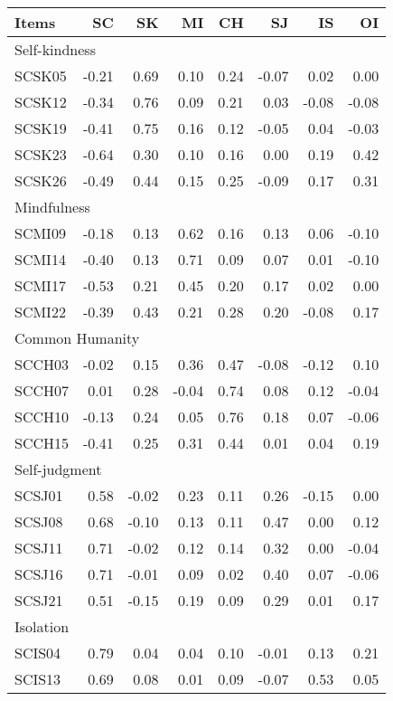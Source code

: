 \begin{longtable}{lrrrrrrr}
\toprule
Items & SC & SK & MI & CH & SJ & IS & OI \\ 
\midrule
\multicolumn{8}{l}{Self-kindness} \\ 
\midrule
SCSK05 & -0.21 & 0.69 & 0.10 & 0.24 & -0.07 & 0.02 & 0.00 \\ 
SCSK12 & -0.34 & 0.76 & 0.09 & 0.21 & 0.03 & -0.08 & -0.08 \\ 
SCSK19 & -0.41 & 0.75 & 0.16 & 0.12 & -0.05 & 0.04 & -0.03 \\ 
SCSK23 & -0.64 & 0.30 & 0.10 & 0.16 & 0.00 & 0.19 & 0.42 \\ 
SCSK26 & -0.49 & 0.44 & 0.15 & 0.25 & -0.09 & 0.17 & 0.31 \\ 
\midrule
\multicolumn{8}{l}{Mindfulness} \\ 
\midrule
SCMI09 & -0.18 & 0.13 & 0.62 & 0.16 & 0.13 & 0.06 & -0.10 \\ 
SCMI14 & -0.40 & 0.13 & 0.71 & 0.09 & 0.07 & 0.01 & -0.10 \\ 
SCMI17 & -0.53 & 0.21 & 0.45 & 0.20 & 0.17 & 0.02 & 0.00 \\ 
SCMI22 & -0.39 & 0.43 & 0.21 & 0.28 & 0.20 & -0.08 & 0.17 \\ 
\midrule
\multicolumn{8}{l}{Common Humanity} \\ 
\midrule
SCCH03 & -0.02 & 0.15 & 0.36 & 0.47 & -0.08 & -0.12 & 0.10 \\ 
SCCH07 & 0.01 & 0.28 & -0.04 & 0.74 & 0.08 & 0.12 & -0.04 \\ 
SCCH10 & -0.13 & 0.24 & 0.05 & 0.76 & 0.18 & 0.07 & -0.06 \\ 
SCCH15 & -0.41 & 0.25 & 0.31 & 0.44 & 0.01 & 0.04 & 0.19 \\ 
\midrule
\multicolumn{8}{l}{Self-judgment} \\ 
\midrule
SCSJ01 & 0.58 & -0.02 & 0.23 & 0.11 & 0.26 & -0.15 & 0.00 \\ 
SCSJ08 & 0.68 & -0.10 & 0.13 & 0.11 & 0.47 & 0.00 & 0.12 \\ 
SCSJ11 & 0.71 & -0.02 & 0.12 & 0.14 & 0.32 & 0.00 & -0.04 \\ 
SCSJ16 & 0.71 & -0.01 & 0.09 & 0.02 & 0.40 & 0.07 & -0.06 \\ 
SCSJ21 & 0.51 & -0.15 & 0.19 & 0.09 & 0.29 & 0.01 & 0.17 \\ 
\midrule
\multicolumn{8}{l}{Isolation} \\ 
\midrule
SCIS04 & 0.79 & 0.04 & 0.04 & 0.10 & -0.01 & 0.13 & 0.21 \\ 
SCIS13 & 0.69 & 0.08 & 0.01 & 0.09 & -0.07 & 0.53 & 0.05 \\ 

\end{longtable}

